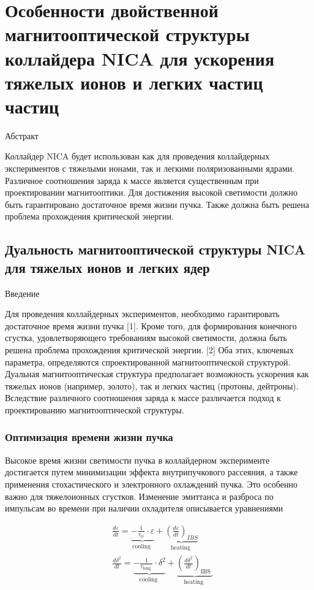 
\chapter{Особенности двойственной магнитооптической структуры коллайдера NICA для ускорения тяжелых ионов и легких частиц частиц}\label{ch:ions_light}

Абстракт

	Коллайдер NICA будет использован как для проведения коллайдерных экспериментов с тяжелыми ионами, так и легкими поляризованными ядрами. Различное соотношения заряда к массе является существенным при проектировании магнитооптики. Для достижения высокой светимости должно быть гарантировано достаточное время жизни пучка. Также должна быть решена проблема прохождения критической энергии.	

\section{Дуальность магнитооптической структуры NICA для тяжелых ионов и легких ядер}\label{sec:ch:ions_light/duality}

Введение
	
	Для проведения коллайдерных экспериментов, необходимо гарантировать достаточное время жизни пучка [1]. Кроме того, для формирования конечного сгустка, удовлетворяющего требованиям высокой светимости, должна быть решена проблема прохождения критической энергии. [2] Оба этих, ключевых параметра, определяются спроектированной магнитооптической структурой.
Дуальная магнитооптическая структура предполагает возможность ускорения как тяжелых ионов (например, золото), так и легких частиц (протоны, дейтроны). Вследствие различного соотношения заряда к массе различается подход к проектированию магнитооптической структуры.


	\subsection{Оптимизация времени жизни пучка}

Высокое время жизни светимости пучка в коллайдерном эксперименте достигается путем минимизации эффекта внутрипучкового рассеяния, а также применения стохастического и электронного охлаждений пучка. Это особенно важно для тяжелоионных сгустков. Изменение эмиттанса и разброса по импульсам во времени при наличии охладителя описывается уравнениями

\begin{equation}
\begin{aligned}
& \frac{d \varepsilon}{d t}=\underbrace{-\frac{1}{\tau_{t r}} \cdot \varepsilon}_{\text {cooling }}+\underbrace{\left(\frac{d \varepsilon}{d t}\right)_{I B S}}_{\text {heating }} \\
& \frac{d \delta^2}{d t}=\underbrace{-\frac{1}{\tau_{\text {long }}} \cdot \delta^2}_{\text {cooling }}+\underbrace{\left(\frac{d \delta^2}{d t}\right)_{\text {IBS }}}_{\text {heating }} \\
&
\end{aligned}
\end{equation}

